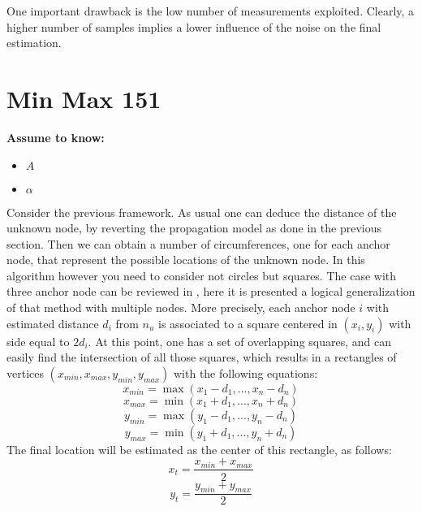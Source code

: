 \documentclass[12pt,twoside]{report}
\begin{document}
One important drawback is the low number of measurements exploited. Clearly, a higher number of samples implies a lower influence of the noise on the final estimation.
\clearpage

\section{Min Max 151}
  \begin{center}
  \textbf{Assume to know:}
  \begin{itemize}
    \centering
    \item $A$
    \item $\alpha$
  \end{itemize}
  \end{center}
Consider the previous framework. As usual one can deduce the distance of the unknown node, by reverting the propagation model as done in the previous section. Then we can obtain a number of circumferences, one for each anchor node, that represent the possible locations of the unknown node. In this algorithm however you need to consider not circles but squares. The case with three anchor node can be reviewed in \cite{inproceedings}, here it is presented a logical generalization of that method with multiple nodes. More precisely, each anchor node $i$ with estimated distance $d_i$ from $n_u$ is associated to a square centered in $(x_i,y_i)$ with side equal to $2d_i$. At this point, one has a set of overlapping squares, and can easily find the intersection of all those squares,  which results in a rectangles of vertices $(x_{min},x_{max},y_{min},y_{max})$ with the following equations:
\begin{equation}
    x_{min}=\max(x_1-d_1,...,x_n-d_n)
\end{equation}
\begin{equation}
    x_{max}=\min(x_1+d_1,...,x_n+d_n)
\end{equation}
\begin{equation}
    y_{min}=\max(y_1-d_1,...,y_n-d_n)
\end{equation}
\begin{equation}
    y_{max}=\min(y_1+d_1,...,y_n+d_n)
\end{equation}
The final location will be estimated as the center of this rectangle, as follows:
\begin{equation}
    x_t=\frac{x_{min}+x_{max}}{2}
\end{equation}
\begin{equation}
    y_t=\frac{y_{min}+y_{max}}{2}
\end{equation}
\end{document}
